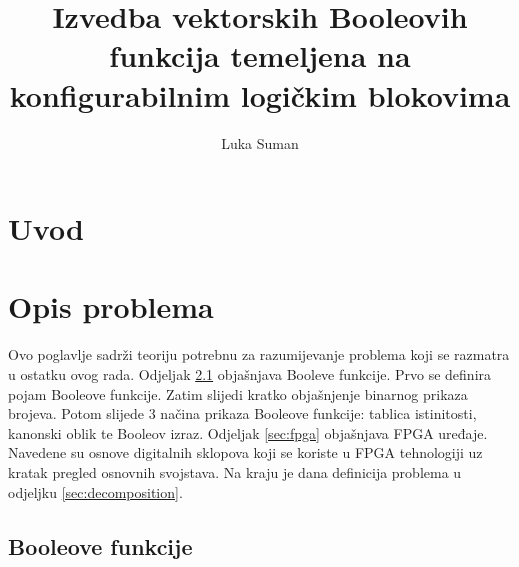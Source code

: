 \documentclass[times, utf8, diplomski]{fer}
\begin{document}

\title{Izvedba vektorskih Booleovih funkcija temeljena na konfigurabilnim logičkim blokovima}

\author{Luka Suman}

\maketitle

\izvornik

\zahvala{}

\tableofcontents

\chapter{Uvod} \label{chapter:introduction}


\chapter{Opis problema} \label{chapter:problem}

Ovo poglavlje sadrži teoriju potrebnu za razumijevanje problema koji se razmatra u ostatku ovog rada. Odjeljak \ref{sec:bool-func} objašnjava Booleve funkcije. Prvo se definira pojam Booleove funkcije. Zatim slijedi kratko objašnjenje binarnog prikaza brojeva. Potom slijede $3$ načina prikaza Booleove funkcije: tablica istinitosti, kanonski oblik te Booleov izraz. Odjeljak \ref{sec:fpga} objašnjava FPGA uređaje. Navedene su osnove digitalnih sklopova koji se koriste u FPGA tehnologiji uz kratak pregled osnovnih svojstava. Na kraju je dana definicija problema u odjeljku \ref{sec:decomposition}.


\section{Booleove funkcije} \label{sec:bool-func}
\end{document}
